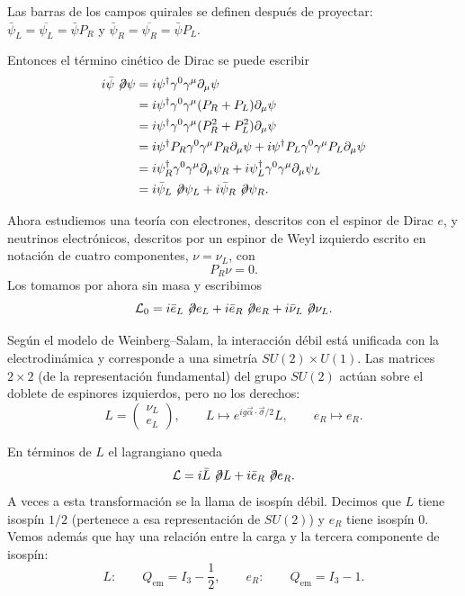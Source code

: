 \documentclass[11pt,a4paper]{article}
\newcommand{\concept}[1]{\textcolor{concept-green}{#1}}
\newcommand{\slashedpartial}{\not\!\partial}
\begin{document}
Las barras de los campos quirales se definen después de proyectar:
$\bar\psi_L=\overline{\psi_L}=\bar\psi P_R$ y
$\bar\psi_R=\overline{\psi_R}=\bar\psi P_L$.

Entonces el término cinético de Dirac se puede escribir
\begin{align*}
  i\bar\psi\slashedpartial\psi
  &=i\psi^\dagger\gamma^0\gamma^\mu\partial_\mu\psi\\
  &=i\psi^\dagger\gamma^0\gamma^\mu(P_R+P_L)\partial_\mu\psi\\
  &=i\psi^\dagger\gamma^0\gamma^\mu(P_R^2+P_L^2)\partial_\mu\psi\\
  &=i\psi^\dagger P_R\gamma^0\gamma^\mu P_R\partial_\mu\psi
    +i\psi^\dagger P_L\gamma^0\gamma^\mu P_L\partial_\mu\psi\\
  &=i\psi_R^\dagger\gamma^0\gamma^\mu\partial_\mu\psi_R
    +i\psi_L^\dagger\gamma^0\gamma^\mu\partial_\mu\psi_L\\
  &=i\bar\psi_L\slashedpartial\psi_L
    +i\bar\psi_R\slashedpartial\psi_R.
\end{align*}

Ahora estudiemos una teoría con electrones, descritos con el espinor de Dirac
$e$, y neutrinos electrónicos, descritos por un espinor de Weyl izquierdo
escrito en notación de cuatro componentes, $\nu=\nu_L$, con
\[
  P_R\nu=0.
\]
Los tomamos por ahora sin masa y escribimos
\[
  \mathcal L_0
  =i\bar e_L\slashedpartial e_L
   +i\bar e_R\slashedpartial e_R
   +i\bar\nu_L\slashedpartial\nu_L.
\]

Según el modelo de Weinberg--Salam, la interacción débil está unificada con la
electrodinámica y corresponde a una simetría $SU(2)\times U(1)$. Las matrices
$2\times2$ (de la representación fundamental) del grupo $SU(2)$ actúan sobre el
doblete de espinores izquierdos, pero no los derechos:
\[
  L=\begin{pmatrix}\nu_L\\e_L\end{pmatrix},
  \qquad
  L\longmapsto e^{ig\vec\alpha\cdot\vec\sigma/2}L,
  \qquad
  e_R\longmapsto e_R.
\]

En términos de $L$ el lagrangiano queda
\[
  \mathcal L=i\bar L\slashedpartial L+i\bar e_R\slashedpartial e_R.
\]
A veces a esta transformación se la llama de \concept{isospín débil}. Decimos
que $L$ tiene isospín $1/2$ (pertenece a esa representación de $SU(2)$) y
$e_R$ tiene isospín $0$. Vemos además que hay una relación entre la carga y la
tercera componente de isospín:
\[
  L:\qquad Q_{\mathrm{em}}=I_3-\frac12,
  \qquad
  e_R:\qquad Q_{\mathrm{em}}=I_3-1.
\]
\end{document}
